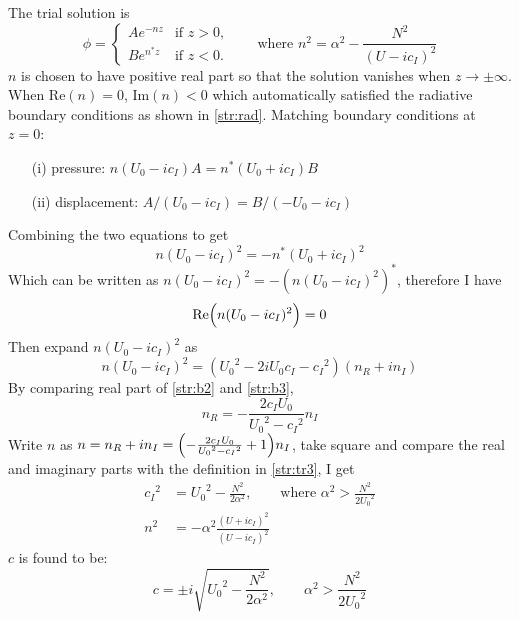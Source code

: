 \begin{enumerate}
The trial solution is
\begin{equation}\label{str:tr3}
\phi =
\begin{cases}
Ae^{-nz} &\text{if $z>0$,}\\
Be^{n^*z} &\text{if $z<0$.}
\end{cases}
\qquad \text{where }n^2=\alpha^2-\frac{N^2}{(U-ic_I)^2}
\end{equation}
$n$ is chosen to have positive real part so that the solution
vanishes when $z \to \pm\infty$. When $\text{Re}(n)=0$,
$\text{Im}(n)<0$ which automatically satisfied the radiative
boundary conditions as shown in \eqref{str:rad}.
\newslide
Matching boundary conditions at $z=0$:
\begin{enumerate}
  \item[(i)] pressure: $n(U_0-ic_I)A=n^*(U_0+ic_I)B$
  \item[(ii)] displacement: $A/(U_0-ic_I)=B/({-U_0}-ic_I)$
\end{enumerate}
Combining the two equations to get
\begin{equation}\label{str:b1}
    n(U_0-ic_I)^2=-n^*(U_0+ic_I)^2
\end{equation}
Which can be written as $n(U_0-ic_I)^2 = -(n(U_0-ic_I)^2)^*$,
therefore I have
\begin{equation}
    \text{Re}\Bigl(n(U_0-ic_I)^2\Bigr)=0\label{str:b2}
\end{equation}
\newslide
Then expand $n(U_0-ic_I)^2$ as
\begin{equation}
    n(U_0-ic_I)^2=({U_0}^2-2iU_0c_I-{c_I}^2)(n_R+in_I)\label{str:b3}
\end{equation}
By comparing real part of \eqref{str:b2} and \eqref{str:b3},
\begin{equation}
    n_R=-\frac{2c_IU_0}{{U_0}^2-{c_I}^2}n_I\label{str:b4}
\end{equation}
\newslide
Write $n$ as
$n=n_R+in_I=\Bigl(-\frac{2c_IU_0}{{U_0}^2-{c_I}^2}+1\Bigr)n_I$, take
square and compare the real and imaginary parts with the definition
in \eqref{str:tr3}, I get
\begin{align}
    {c_I}^2 &={U_0}^2-\frac{N^2}{2\alpha^2},\qquad\text{where }\alpha^2>\frac{N^2}{2{U_0}^2}\label{str:sol1}\\
    n^2 &=-\alpha^2\frac{(U+ic_I)^2}{(U-ic_I)^2}\label{str:sol2}
\end{align}
\newslide
$c$ is found to be:
\begin{equation}\label{str:c2}
    \boxed{c=\pm
    i\sqrt{{U_0}^2-\frac{N^2}{2\alpha^2}},\qquad\alpha^2>\frac{N^2}{2{U_0}^2}}
\end{equation}
\end{enumerate}
